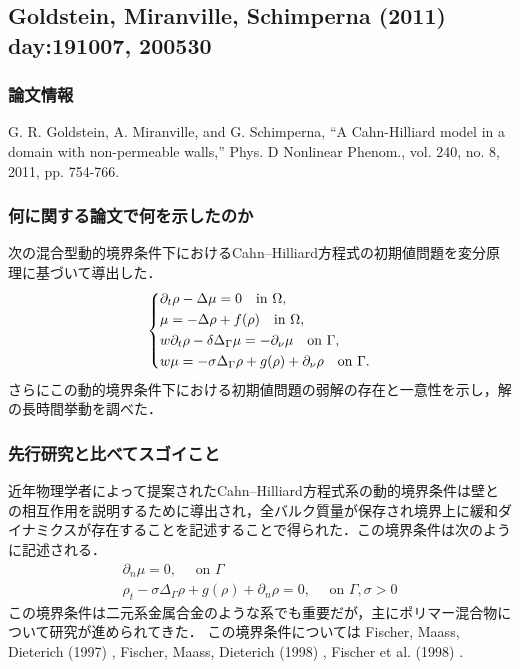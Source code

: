 \documentclass[openary, a4paper, oneside]{jsarticle}
\begin{document}
\newpage

\subsection{Goldstein, Miranville, Schimperna (2011) \cite{GoldsteinMiranvilleSchimperna2011} day:191007, 200530}
	\subsubsection{論文情報}
	G. R. Goldstein, A. Miranville, and G. Schimperna, “A Cahn-Hilliard model in a domain with non-permeable walls,” Phys. D Nonlinear Phenom., vol. 240, no. 8, 2011, pp. 754-766.
	\subsubsection{何に関する論文で何を示したのか}
	次の混合型動的境界条件下におけるCahn--Hilliard方程式の初期値問題を変分原理に基づいて導出した．
	\begin{equation}\left\{\begin{aligned}
		&\partial_t\rho - \Delta\mu = 0\quad\text{in }\Omega,\\
		&\mu = -\Delta\rho + f(\rho)\quad\text{in }\Omega,\\
		&w\partial_t\rho - \delta \Delta_{\Gamma}\mu = -\partial_{\nu}\mu\quad\text{on }\Gamma,\\
		&w\mu = -\sigma\Delta_{\Gamma}\rho + g(\rho) + \partial_{\nu}\rho\quad\text{on }\Gamma.
	\end{aligned}\right.\end{equation}
	さらにこの動的境界条件下における初期値問題の弱解の存在と一意性を示し，解の長時間挙動を調べた．
	\subsubsection{先行研究と比べてスゴイこと}
	近年物理学者によって提案されたCahn--Hilliard方程式系の動的境界条件は壁との相互作用を説明するために導出され，全バルク質量が保存され境界上に緩和ダイナミクスが存在することを記述することで得られた．この境界条件は次のように記述される．
	\begin{equation}
		\begin{array}{l}
		\partial_{n} \mu=0, \quad \text { on } \Gamma \\
		\rho_{t}-\sigma \Delta_{\Gamma} \rho+g(\rho)+\partial_{n} \rho=0, \quad \text { on } \Gamma, \sigma>0
		\end{array}
	\end{equation}
	この境界条件は二元系金属合金のような系でも重要だが，主にポリマー混合物について研究が進められてきた．
	この境界条件については Fischer, Maass, Dieterich (1997) \cite{FischerMaassDieterich1997}, Fischer, Maass, Dieterich (1998) \cite{FischerMaassDieterich1998}, Fischer et al. (1998) \cite{FischerReinhardDietrichETAL1998}.
\end{document}
